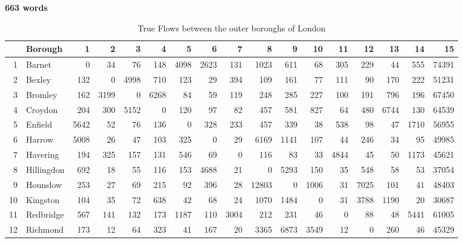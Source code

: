 \documentclass[11pt]{article} %
\begin{document}
\textbf{663 words}












\begin{table}
\footnotesize
\caption{True Flows between the outer boroughs of London}
\begin{tabular}{|r|l|r|r|r|r|r|r|r|r|r|r|r|r|r|r|r|}
\hline
\multicolumn{1}{|l|}{} & Borough & 1 & 2 & 3 & 4 & 5 & 6 & 7 & 8 & 9 & 10 & 11 & 12 & 13 & 14 & 15 \\ \hline
1 & Barnet & 0 & 34 & 76 & 148 & 4098 & 2623 & 131 & 1023 & 611 & 68 & 305 & 229 & 44 & 555 & 74391 \\ \hline
2 & Bexley & 132 & 0 & 4998 & 710 & 123 & 29 & 394 & 109 & 161 & 77 & 111 & 90 & 170 & 222 & 51231 \\ \hline
3 & Bromley & 162 & 3199 & 0 & 6268 & 84 & 59 & 119 & 248 & 285 & 227 & 100 & 191 & 796 & 196 & 67450 \\ \hline
4 & Croydon & 204 & 300 & 5152 & 0 & 120 & 97 & 82 & 457 & 581 & 827 & 64 & 480 & 6744 & 130 & 64539 \\ \hline
5 & Enfield & 5642 & 52 & 76 & 136 & 0 & 328 & 233 & 457 & 339 & 38 & 538 & 98 & 47 & 1710 & 56955 \\ \hline
6 & Harrow & 5008 & 26 & 47 & 103 & 325 & 0 & 29 & 6169 & 1141 & 107 & 44 & 246 & 34 & 95 & 49985 \\ \hline
7 & Havering & 194 & 325 & 157 & 131 & 546 & 69 & 0 & 116 & 83 & 33 & 4844 & 45 & 50 & 1173 & 45621 \\ \hline
8 & Hillingdon & 692 & 18 & 55 & 116 & 153 & 4688 & 21 & 0 & 5293 & 150 & 35 & 548 & 58 & 53 & 37054 \\ \hline
9 & Hounslow & 253 & 27 & 69 & 215 & 92 & 396 & 28 & 12803 & 0 & 1006 & 31 & 7025 & 101 & 41 & 48403 \\ \hline
10 & Kingston & 104 & 35 & 72 & 638 & 42 & 68 & 24 & 1070 & 1484 & 0 & 31 & 3788 & 1190 & 20 & 30687 \\ \hline
11 & Redbridge & 567 & 141 & 132 & 173 & 1187 & 110 & 3004 & 212 & 231 & 46 & 0 & 88 & 48 & 5441 & 61005 \\ \hline
12 & Richmond & 173 & 12 & 64 & 323 & 41 & 167 & 20 & 3365 & 6873 & 3549 & 12 & 0 & 260 & 46 & 45329 \\ \hline

\end{tabular}
\end{table}
\end{document}
